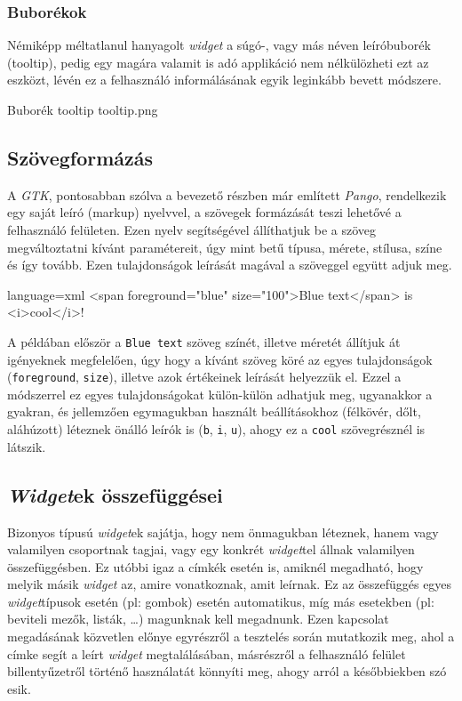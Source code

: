 \subsubsection{Buborékok}

Némiképp méltatlanul hanyagolt \textit{widget} a súgó-, vagy más néven leíróbuborék (tooltip), pedig egy magára valamit is adó applikáció nem nélkülözheti ezt az eszközt, lévén ez a felhasználó informálásának egyik leginkább bevett módszere.

{Buborék}
{tooltip}
{tooltip.png}

\subsection{Szövegformázás}

A \textit{GTK}, pontosabban szólva a bevezető részben már említett \textit{Pango}, rendelkezik egy saját leíró (markup) nyelvvel, a szövegek formázását teszi lehetővé a felhasználó felületen. Ezen nyelv segítségével állíthatjuk be a szöveg megváltoztatni kívánt paramétereit, úgy mint betű típusa, mérete, stílusa, színe és így tovább. Ezen tulajdonságok leírását magával a szöveggel együtt adjuk meg.

\lstoneline
{language=xml}
{<span foreground="blue" size="100">Blue text</span> is <i>cool</i>!}

A példában először a \texttt{Blue text} szöveg színét, illetve méretét állítjuk át igényeknek megfelelően, úgy hogy a kívánt szöveg köré az egyes tulajdonságok (\texttt{foreground}, \texttt{size}), illetve azok értékeinek leírását helyezzük el. Ezzel a módszerrel ez egyes tulajdonságokat külön-külön adhatjuk meg, ugyanakkor a gyakran, és jellemzően egymagukban használt beállításokhoz (félkövér, dőlt, aláhúzott) léteznek önálló leírók is (\texttt{b}, \texttt{i}, \texttt{u}), ahogy ez a \texttt{cool} szövegrésznél is látszik.

\subsection{\textit{Widget}ek összefüggései}

Bizonyos típusú \textit{widget}ek sajátja, hogy nem önmagukban léteznek, hanem vagy valamilyen csoportnak tagjai, vagy egy konkrét \textit{widget}tel állnak valamilyen összefüggésben. Ez utóbbi igaz a címkék esetén is, amiknél megadható, hogy melyik másik \textit{widget} az, amire vonatkoznak, amit leírnak. Ez az összefüggés egyes \textit{widget}típusok esetén (pl: gombok) esetén automatikus, míg más esetekben (pl: beviteli mezők, listák, \dots ) magunknak kell megadnunk. Ezen kapcsolat megadásának közvetlen előnye egyrészről a tesztelés során mutatkozik meg, ahol a címke segít a leírt \textit{widget} megtalálásában, másrészről a felhasználó felület billentyűzetről történő használatát könnyíti meg, ahogy arról a későbbiekben szó esik.

